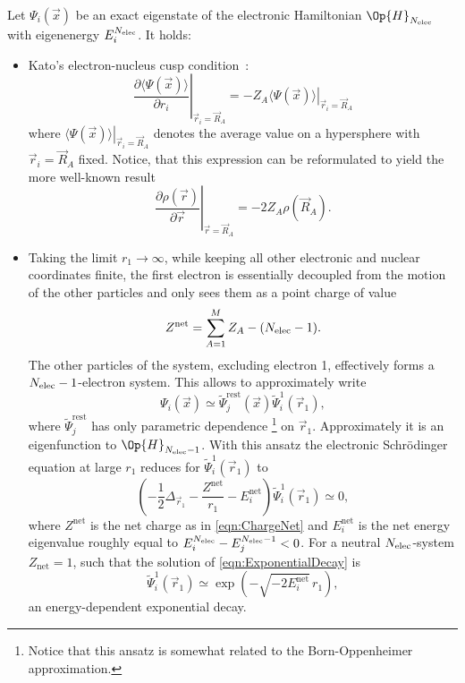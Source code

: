 \begin{rem}
	\label{rem:PhysicalProperties}
	Let $\Psi_i(\vec{x})$ be an exact eigenstate of the electronic
	Hamiltonian $\Op{H}_{\Nelec}$ with eigenenergy $E^{N_\text{elec}}_i$.
	It holds:
	\begin{itemize}
		\item Kato's electron-nucleus cusp condition~\cite{Kato1957}:
			\[
				\left. \frac{\partial \langle\Psi(\vec{x})\rangle}
				{\partial r_i} \right|_{\vec{r}_i = \vec{R}_A}
				= -Z_A \left. \langle\Psi(\vec{x})\rangle \right|_{\vec{r}_i = \vec{R}_A}
			\]
			where $\left. \langle\Psi(\vec{x})\rangle \right|_{\vec{r}_i = \vec{R}_A}$
			denotes the average value on a hypersphere with $\vec{r}_i = \vec{R}_A$ fixed.
			Notice, that this expression can be reformulated to yield
			the more well-known result
			\[
				\left. \frac{\partial \rho(\vec{r})}{\partial \vec{r}} \right|_{\vec{r} = \vec{R}_A}
				= -2 Z_A \rho(\vec{R}_A).
			\]
		\item Taking the limit $r_1 \to \infty$,
			while keeping all other electronic and nuclear coordinates finite,
			the first electron is essentially decoupled from the motion
			of the other particles
			and only sees them as a point charge of value
			\begin{equation}
				Z^\text{net} = \sum_{A=1}^M Z_A - (N_\text{elec} -1).
				\label{eqn:ChargeNet}
			\end{equation}
			The other particles of the system, \ie excluding electron 1,
			effectively forms a $N_\text{elec}-1$-electron system.
			This allows to approximately write
			\[ \Psi_i(\vec{x}) \simeq \tilde{\Psi}^\text{rest}_j(\vec{x}) \tilde{\Psi}^1_i(\vec{r}_1), \]
			where $\tilde{\Psi}^\text{rest}_j$ has only parametric dependence%
			\footnote{Notice that this ansatz is somewhat related to the Born-Oppenheimer
			approximation.}
			on $\vec{r}_1$.
			Approximately it is an eigenfunction to $\Op{H}_{\Nelec-1}$.
			With this ansatz the electronic Schrödinger equation at large $r_1$
			reduces for $\tilde{\Psi}^1_i(\vec{r}_1)$ to
			\begin{equation}
				\left( -\frac12 \Delta_{\vec{r}_1} - \frac{Z^\text{net}}{r_1} - E^\text{net}_i \right)
				\tilde{\Psi}_i^1(\vec{r}_1) \simeq 0,
				\label{eqn:ExponentialDecay}
			\end{equation}
			where $Z^\text{net}$ is the net charge as in \eqref{eqn:ChargeNet}
			and $E^\text{net}_i$ is the net energy eigenvalue
			roughly equal to
			$E^{N_\text{elec}}_i - E^{N_\text{elec}-1}_j < 0$.
			For a neutral $N_\text{elec}$-system $Z_\text{net} = 1$,
			such that the solution of \eqref{eqn:ExponentialDecay} is
			\begin{equation}
				\tilde{\Psi}_i^1(\vec{r}_1) \simeq \exp\left( - \sqrt{-2E^\text{net}_i} \, r_1 \right),
				\label{eqn:EnergyDependentDecay}
			\end{equation}
			\ie an energy-dependent exponential decay.
	\end{itemize}
\end{rem}
